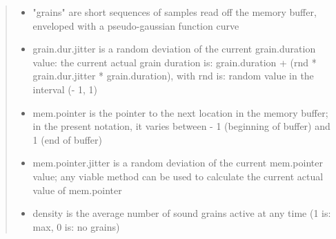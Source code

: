 \begin{quote}
    \begin{itemize}
    \item "grains" are short sequences of samples read off the memory
    buffer, enveloped with a pseudo-gaussian function curve 
    \item grain.dur.jitter is a random deviation of the current
    grain.duration value: the current actual grain duration is:
    grain.duration + (rnd * grain.dur.jitter * grain.duration), with rnd
    is: random value in the interval (- 1, 1) 
    \item mem.pointer is the pointer to the next location in the memory
    buffer; in the present notation, it varies between - 1 (beginning
    of buffer) and 1 (end of buffer) 
    \item mem.pointer.jitter is a random deviation of the current
    mem.pointer value; any viable method can be used to
    calculate the current actual value of mem.pointer 
    \item density is the average number of sound grains active at any
    time (1 is: max, 0 is: no grains)
\end{itemize}
\end{quote}

